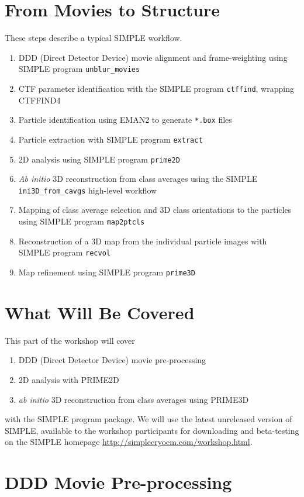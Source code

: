 \documentclass[a4paper,11pt]{article}
\newcommand{\prgname}[1]{\textcolor{NavyBlue}{\texttt{#1}}}
\begin{document}
\section{From Movies to Structure}
These steps describe a typical SIMPLE workflow.
\begin{enumerate}
\item DDD (Direct Detector Device) movie alignment and frame-weighting using SIMPLE program \prgname{unblur\_movies}
\item CTF parameter identification with the SIMPLE program \prgname{ctffind}, wrapping CTFFIND4 \citep{rohou2015ctffind4}
\item Particle identification using EMAN2 \citep{Tang:2007aa} to generate \texttt{*.box} files
\item Particle extraction with SIMPLE program \prgname{extract}
\item 2D analysis using SIMPLE program \prgname{prime2D}
\item \textit{Ab initio} 3D reconstruction from class averages using the SIMPLE \prgname{ini3D\_from\_cavgs} high-level workflow
\item Mapping of class average selection and 3D class orientations to the particles using SIMPLE program \prgname{map2ptcls}
\item Reconstruction of a 3D map from the individual particle images with SIMPLE program \prgname{recvol}
\item Map refinement using SIMPLE program \prgname{prime3D}
\end{enumerate}

\section{What Will Be Covered}
This part of the workshop will cover 
\begin{enumerate}
\item DDD (Direct Detector Device) movie pre-processing
\item 2D analysis with PRIME2D
\item \textit{ab initio} 3D reconstruction from class averages using PRIME3D
\end{enumerate}
with the SIMPLE program package. We will use the latest unreleased version of SIMPLE, available to the workshop participants for downloading and beta-testing on the SIMPLE homepage \url{http://simplecryoem.com/workshop.html}.

\section{DDD Movie Pre-processing}
\end{document}
